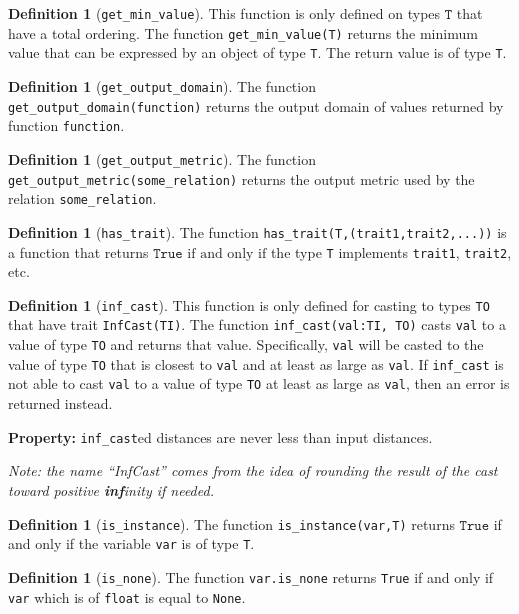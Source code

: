 \documentclass[11pt,a4paper]{article}
\theoremstyle{definition}
\newtheorem{definition}[theorem]{Definition}
\newcommand{\True}{\texttt{True}}
\newcommand{\T}{\texttt{T}}
\newcommand{\iffText}{\text{if and only if}}
\begin{document}
\begin{definition}[\texttt{get\_min\_value}]
    This function is only defined on types $\T$ that have a total ordering. The function \texttt{get\_min\_value(T)} returns the minimum value that can be expressed by an object of type \texttt{T}. The return value is of type \texttt{T}.
\end{definition}
\begin{definition}[\texttt{get\_output\_domain}]
    The function \texttt{get\_output\_domain(function)} returns the output domain of values returned by function \texttt{function}.
\end{definition}
\begin{definition}[\texttt{get\_output\_metric}]
    The function \texttt{get\_output\_metric(some\_relation)} returns the output metric used by the relation \texttt{some\_relation}.
\end{definition}
\begin{definition}[\texttt{has\_trait}]
    The function \texttt{has\_trait(T,(trait1,trait2,...))} is a function that returns $\True$ $\iffText$ the type \texttt{T} implements \texttt{trait1}, \texttt{trait2}, etc.
\end{definition}
\begin{definition}[\texttt{inf\_cast}]
\label{defn:inf-cast}
    This function is only defined for casting to types \texttt{TO} that have trait \texttt{InfCast(TI)}. The function \texttt{inf\_cast(val:TI, TO)} casts \texttt{val} to a value of type \texttt{TO} and returns that value. Specifically, \texttt{val} will be casted to the value of type \texttt{TO} that is closest to \texttt{val} and at least as large as \texttt{val}. If \texttt{inf\_cast} is not able to cast \texttt{val} to a value of type \texttt{TO} at least as large as \texttt{val}, then an error is returned instead.
    
    \textbf{Property:} \texttt{inf\_cast}ed distances are never less than input distances.
    
    \emph{Note: the name ``InfCast'' comes from the idea of rounding the result of the cast toward positive \textbf{inf}inity if needed.}
\end{definition}
\begin{definition}[\texttt{is\_instance}]
    The function \texttt{is\_instance(var,T)} returns $\True$ if and only if the variable \texttt{var} is of type \texttt{T}.
\end{definition}
\begin{definition}[\texttt{is\_none}]
    The function \texttt{var.is\_none} returns \texttt{True} if and only if \texttt{var} which is of \texttt{float} is equal to \texttt{None}.
\end{definition}
\end{document}
